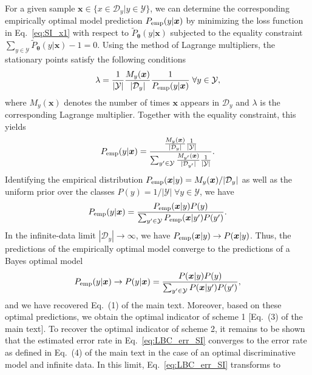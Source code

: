 \documentclass[twocolumn,aps,pra,superscriptaddress,tightlines,nofootinbib]{revtex4-2}
\begin{document}
	\indent For a given sample $\bm{x} \in \{x \in \mathcal{D}_{y}|y \in \mathcal{Y} \}$, we can determine the corresponding empirically optimal model prediction $P_{\rm emp}(y|\bm{x})$ by minimizing the loss function in Eq.~\eqref{eq:SI_x1} with respect to $\tilde{P}_{\bm{\theta}}(y|\bm{x})$ subjected to the equality constraint $\sum_{y\in\mathcal{Y}} \tilde{P}_{\bm{\theta}}(y|\bm{x}) - 1 = 0$. Using the method of Lagrange multipliers, the stationary points satisfy the following conditions
	\begin{equation}
		\lambda = \frac{1}{|\mathcal{Y}|} \frac{M_{y}(\bm{x})}{|\mathcal{D}_{y}|} \frac{1}{P_{\rm emp}(y|\bm{x})}\; \forall y \in \mathcal{Y},
	\end{equation}
	where $M_{y}(\bm{x})$ denotes the number of times $\bm{x}$ appears in $\mathcal{D}_{y}$ and $\lambda$ is the corresponding Lagrange multiplier. Together with the equality constraint, this yields
	\begin{equation}
		P_{\rm emp}(y|\bm{x}) = \frac{\frac{M_{y}(\bm{x})}{|\mathcal{D}_{y}|} \frac{1}{|\mathcal{Y}|}}{\sum_{y' \in \mathcal{Y}} \frac{M_{y'}(\bm{x})}{|\mathcal{D}_{y'}|} \frac{1}{|\mathcal{Y}|}}.
	\end{equation}
	Identifying the empirical distribution $P_{\rm emp}(\bm{x}|y) = M_{y}(\bm{x})/|\mathcal{D}_{y}|$ as well as the uniform prior over the classes $P(y) = 1/|\mathcal{Y}|\; \forall y \in \mathcal{Y}$, we have
	\begin{equation}\label{eq:SI_emp}
		P_{\rm emp}(y|\bm{x}) = \frac{P_{\rm emp}(\bm{x}|y)P(y)}{\sum_{y' \in \mathcal{Y}} P_{\rm emp}(\bm{x}|y')P(y')}.
	\end{equation}
	In the infinite-data limit $|\mathcal{D}_{y}| \rightarrow \infty$, we have $P_{\rm emp}(\bm{x}|y) \rightarrow P(\bm{x}|y)$. Thus, the predictions of the empirically optimal model converge to the predictions of a Bayes optimal model
	\begin{equation}\label{eq:SI_optt}
		P_{\rm emp}(y|\bm{x}) \rightarrow P(y|\bm{x}) = \frac{P(\bm{x}|y)P(y)}{\sum_{y' \in \mathcal{Y}} P(\bm{x}|y')P(y')},
	\end{equation}
	and we have recovered Eq.~(1) of the main text. Moreover, based on these optimal predictions, we obtain the optimal indicator of scheme 1 [Eq.~(3) of the main text]. To recover the optimal indicator of scheme 2, it remains to be shown that the estimated error rate in Eq.~\eqref{eq:LBC_err_SI} converges to the error rate as defined in Eq.~(4) of the main text in the case of an optimal discriminative model and infinite data. In this limit, Eq.~\eqref{eq:LBC_err_SI} transforms to 
\end{document}
